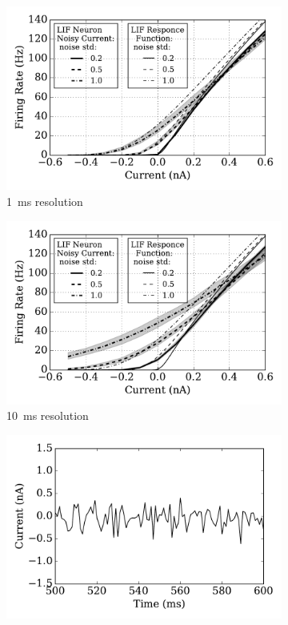 	
	\begin{figure}[tbp!]
		\centering
		\begin{subfigure}[t]{0.49\textwidth}
			\includegraphics[width=\textwidth]{pics_iconip/2-1.pdf}
			\caption{1~ms resolution}
			\label{Fig:current-1}
		\end{subfigure}
		\begin{subfigure}[t]{0.49\textwidth}
			\includegraphics[width=\textwidth]{pics_iconip/2-10.pdf}
			\caption{10~ms resolution}
			\label{Fig:current-10}
		\end{subfigure}
		\begin{subfigure}[t]{0.49\textwidth}
			\includegraphics[width=\textwidth]{pics_iconip/curr_dt1.pdf}

\end{subfigure}
\end{figure}
